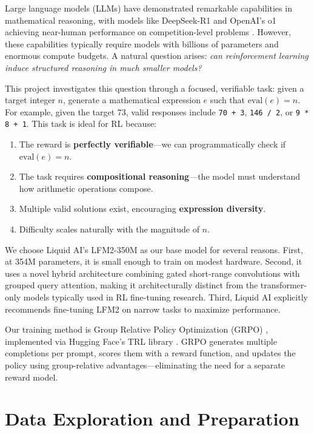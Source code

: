 \documentclass[11pt, letterpaper]{article}
\begin{document}
Large language models (LLMs) have demonstrated remarkable capabilities in mathematical reasoning, with models like DeepSeek-R1 and OpenAI's o1 achieving near-human performance on competition-level problems \cite{deepseekmath}. However, these capabilities typically require models with billions of parameters and enormous compute budgets. A natural question arises: \emph{can reinforcement learning induce structured reasoning in much smaller models?}

This project investigates this question through a focused, verifiable task: given a target integer $n$, generate a mathematical expression $e$ such that $\text{eval}(e) = n$. For example, given the target 73, valid responses include \texttt{70 + 3}, \texttt{146 / 2}, or \texttt{9 * 8 + 1}. This task is ideal for RL because:

\begin{enumerate}
    \item The reward is \textbf{perfectly verifiable}---we can programmatically check if $\text{eval}(e) = n$.
    \item The task requires \textbf{compositional reasoning}---the model must understand how arithmetic operations compose.
    \item Multiple valid solutions exist, encouraging \textbf{expression diversity}.
    \item Difficulty scales naturally with the magnitude of $n$.
\end{enumerate}

We choose Liquid AI's LFM2-350M \cite{lfm2} as our base model for several reasons. First, at 354M parameters, it is small enough to train on modest hardware. Second, it uses a novel hybrid architecture combining gated short-range convolutions with grouped query attention, making it architecturally distinct from the transformer-only models typically used in RL fine-tuning research. Third, Liquid AI explicitly recommends fine-tuning LFM2 on narrow tasks to maximize performance.

Our training method is Group Relative Policy Optimization (GRPO) \cite{deepseekmath}, implemented via Hugging Face's TRL library \cite{trl}. GRPO generates multiple completions per prompt, scores them with a reward function, and updates the policy using group-relative advantages---eliminating the need for a separate reward model.

\section{Data Exploration and Preparation}
\label{sec:data}
\end{document}
